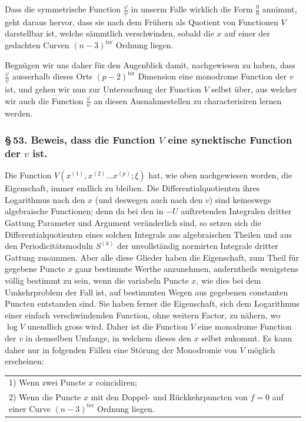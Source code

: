 \documentclass[10pt]{article}
\begin{document}
Dass die symmetrische Function \(\frac{\varphi}{\psi}\) in unserm Falle wirklich die Form \(\frac00\) annimmt, geht daraus hervor, dass sie nach dem Frühern als Quotient von Functionen \(V\) darstellbar ist, welche sämmtlich verschwinden, sobald die \(x\) auf einer der gedachten Curven \((n-3)^{\mathrm{ter}}\) Ordnung liegen.

Begnügen wir uns daher für den Augenblick damit, nachgewiesen zu haben, dass \(\frac{\varphi}{\psi}\) ausserhalb dieses Orts \((p-2)^{\mathrm{ter}}\) Dimension eine monodrome Function der \(v\) ist, und gehen wir nun zur Untersuchung der Function \(V\) selbst über, aus welcher wir auch die Function \(\frac{\varphi}{\psi}\) an diesen Ausnahmestellen zu characterisiren lernen werden.

\subsubsection*{\S\,53. Beweis, dass die Function \(V\) eine synektische Function der \(v\) ist.}

Die Function \(V(x^{(1)},x^{(2)}\ldots x^{(p)};\xi)\) hat, wie oben nachgewiesen worden, die Eigenschaft, immer endlich zu bleiben. Die Differentialquotienten ihres Logarithmus nach den \(x\) (und deswegen auch nach den \(v\)) sind keineswegs algebraische Functionen; denn da bei den in \(-U\) auftretenden Integralen dritter Gattung Parameter und Argument veränderlich sind, so setzen sich die Differentialquotienten eines solchen Integrals aus algebraischen Theilen und aus den Periodicitätsmoduln \(S^{(k)}\) der unvollständig normirten Integrale dritter Gattung zusammen. Aber alle diese Glieder haben die Eigenschaft, zum Theil für gegebene Puncte \(x\) ganz bestimmte Werthe anzunehmen, anderntheils wenigstens völlig bestimmt zu sein, wenn die variabeln Puncte \(x\), wie dies bei dem Umkehrproblem der Fall ist, auf bestimmten Wegen aus gegebenen constanten Puncten entstanden sind. Sie haben ferner die Eigenschaft, sich dem Logarithmus einer einfach verschwindenden Function, ohne weitern Factor, zu nähern, wo \(\log V\) unendlich gross wird. Daher ist die Function \(V\) eine monodrome Function der \(v\) in demselben Umfange, in welchem dieses den \(x\) selbst zukommt. Es kann daher nur in folgenden Fällen eine Störung der Monodromie von \(V\) möglich erscheinen:

\begin{center}
\begin{tabular}{@{}p{5.15in}@{}}
1) Wenn zwei Puncte \(x\) coincidiren;\\
2) Wenn die Puncte \(x\) mit den Doppel- und Rückkehrpuncten von \(f=0\) auf einer Curve \((n-3)^{\mathrm{ter}}\) Ordnung liegen.
\end{tabular}
\end{center}
\end{document}
